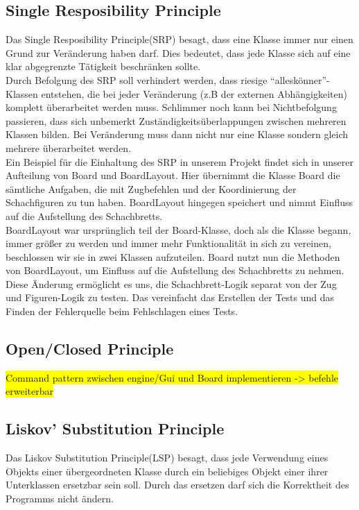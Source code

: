 \documentclass[
10pt, %
a4paper, %
oneside, %
headinclude,footinclude, %
BCOR5mm, %
]{scrartcl}
\begin{document}
\begin{onehalfspace}
\subsection{Single Resposibility Principle}
Das Single Resposibility Principle(SRP) besagt, dass eine Klasse immer nur einen Grund zur Veränderung haben darf. Dies bedeutet, dass jede Klasse sich auf eine klar abgegrenzte Tätigkeit beschränken sollte. 
\\
Durch Befolgung des SRP soll verhindert werden, dass riesige \enquote{alleskönner}-Klassen entstehen, die bei jeder Veränderung (z.B der externen Abhängigkeiten) komplett überarbeitet werden muss. Schlimmer noch kann bei Nichtbefolgung passieren, dass sich unbemerkt Zuständigkeitsüberlappungen zwischen mehreren Klassen bilden. Bei Veränderung muss dann nicht nur eine Klasse sondern gleich mehrere überarbeitet werden.
\\
Ein Beispiel für die Einhaltung des SRP in unserem Projekt findet sich in unserer Aufteilung von Board und BoardLayout. Hier übernimmt die Klasse Board die sämtliche Aufgaben, die mit Zugbefehlen und der Koordinierung der Schachfiguren zu tun haben. BoardLayout hingegen speichert und nimmt Einfluss auf die Aufstellung des Schachbretts.
\\
BoardLayout war ursprünglich teil der Board-Klasse, doch als die Klasse begann, immer größer zu werden und immer mehr Funktionalität in sich zu vereinen, beschlossen wir sie in zwei Klassen aufzuteilen.
Board nutzt nun die Methoden von BoardLayout, um Einfluss auf die Aufstellung des Schachbretts zu nehmen.
\\
Diese Änderung ermöglicht es uns, die Schachbrett-Logik separat von der Zug und Figuren-Logik zu testen. Das vereinfacht das Erstellen der Tests und das Finden der Fehlerquelle beim Fehlschlagen eines Tests.
\subsection{Open/Closed Principle}
\colorbox{yellow}{Command pattern zwischen engine/Gui und Board implementieren -> befehle erweiterbar}
\subsection{Liskov' Substitution Principle}
Das Liskov Substitution Principle(LSP) besagt, dass jede Verwendung eines Objekts einer übergeordneten Klasse durch ein beliebiges Objekt einer ihrer Unterklassen ersetzbar sein soll. Durch das ersetzen darf sich die Korrektheit des Programms nicht ändern.


\end{onehalfspace}
\end{document}
